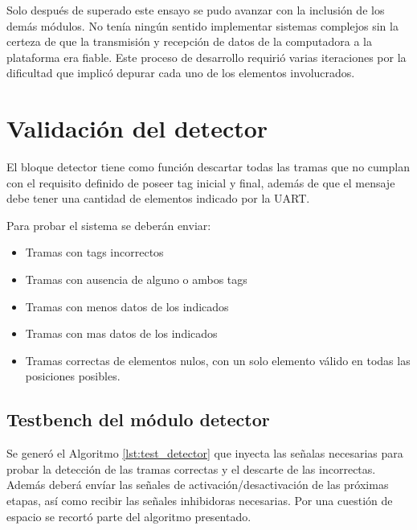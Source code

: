 		Solo después de superado este ensayo se pudo avanzar con la inclusión de los demás módulos. No tenía ningún sentido implementar sistemas complejos sin la certeza de que la transmisión y recepción de datos de la computadora a la plataforma era fiable. Este proceso de desarrollo requirió varias iteraciones por la dificultad que implicó depurar cada uno de los elementos involucrados.
	
\section{Validación del detector}

	El bloque detector tiene como función descartar todas las tramas que no cumplan con el requisito definido de poseer tag inicial y final, además de que el mensaje debe tener una cantidad de elementos indicado por la UART.
	
	Para probar el sistema se deberán enviar:
	
	\begin{itemize}
		\item Tramas con tags incorrectos
		\item Tramas con ausencia de alguno o ambos tags
		\item Tramas con menos datos de los indicados
		\item Tramas con mas datos de los indicados
		\item Tramas correctas de elementos nulos, con un solo elemento válido en todas las posiciones posibles.
	\end{itemize}
	
	\subsection{Testbench del módulo detector}
			
		Se generó el Algoritmo \ref{lst:test_detector} que inyecta las señalas necesarias para probar la detección de las tramas correctas y el descarte de las incorrectas. Además deberá envíar las señales de activación/desactivación de las próximas etapas, así como recibir las señales inhibidoras necesarias. Por una cuestión de espacio se recortó parte del algoritmo presentado.		
			
